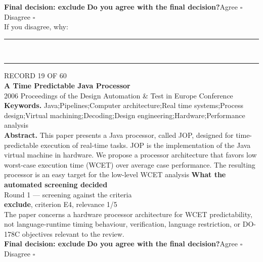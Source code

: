 \documentclass[11pt,a4paper]{article}
\begin{document}
{\small\textbf{Final decision: exclude}}
\vspace{2mm}
{\small\textbf{Do you agree with the final decision?}\quad{}Agree $\square$\qquad{}Disagree $\square$}\\[1mm]
{\footnotesize\color{soft}If you disagree, why:}\\[1mm]
\color{rule}\rule{\linewidth}{0.3pt}\\[3mm]\rule{\linewidth}{0.3pt}\color{black}
\clearpage
{\color{soft}\footnotesize RECORD 19 OF 60}\\[1mm]
{\large\bfseries A Time Predictable Java Processor}\\[1.5mm]
{\color{soft}\small 2006 \textperiodcentered{} Proceedings of the Design Automation \& Test in Europe Conference}\\[2mm]
{\small\textbf{Keywords.} Java;Pipelines;Computer architecture;Real time systems;Process design;Virtual machining;Decoding;Design engineering;Hardware;Performance analysis}\\[2mm]
{\small\textbf{Abstract.} This paper presents a Java processor, called JOP, designed for time-predictable execution of real-time tasks. JOP is the implementation of the Java virtual machine in hardware. We propose a processor architecture that favors low worst-case execution time (WCET) over average case performance. The resulting processor is an easy target for the low-level WCET analysis}
\vspace{3mm}
\vspace{2.5mm}
{\small\textbf{What the automated screening decided}}\\[2mm]
{\footnotesize\color{soft}Round 1 --- screening against the criteria}\\[0.5mm]
{\small\textbf{exclude}, criterion E4, relevance 1/5}\\[0.5mm]
{\small The paper concerns a hardware processor architecture for WCET predictability, not language-runtime timing behaviour, verification, language restriction, or DO-178C objectives relevant to the review.}\\[2.5mm]
{\small\textbf{Final decision: exclude}}
\vspace{2mm}
{\small\textbf{Do you agree with the final decision?}\quad{}Agree $\square$\qquad{}Disagree $\square$}\\[1mm]
\end{document}
